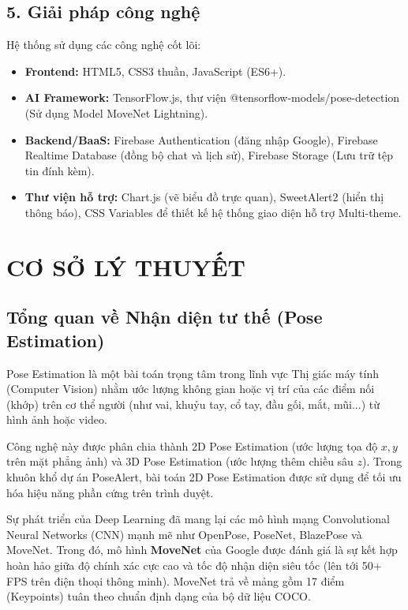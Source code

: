 \documentclass[12pt,a4paper]{report}
\begin{document}
\section*{5. Giải pháp công nghệ}
Hệ thống sử dụng các công nghệ cốt lõi:
\begin{itemize}
    \item \textbf{Frontend:} HTML5, CSS3 thuần, JavaScript (ES6+).
    \item \textbf{AI Framework:} TensorFlow.js, thư viện @tensorflow-models/pose-detection (Sử dụng Model MoveNet Lightning).
    \item \textbf{Backend/BaaS:} Firebase Authentication (đăng nhập Google), Firebase Realtime Database (đồng bộ chat và lịch sử), Firebase Storage (Lưu trữ tệp tin đính kèm).
    \item \textbf{Thư viện hỗ trợ:} Chart.js (vẽ biểu đồ trực quan), SweetAlert2 (hiển thị thông báo), CSS Variables để thiết kế hệ thống giao diện hỗ trợ Multi-theme.
\end{itemize}

\chapter{CƠ SỞ LÝ THUYẾT}

\section{Tổng quan về Nhận diện tư thế (Pose Estimation)}
Pose Estimation là một bài toán trọng tâm trong lĩnh vực Thị giác máy tính (Computer Vision) nhằm ước lượng không gian hoặc vị trí của các điểm nối (khớp) trên cơ thể người (như vai, khuỷu tay, cổ tay, đầu gối, mắt, mũi...) từ hình ảnh hoặc video. 

Công nghệ này được phân chia thành 2D Pose Estimation (ước lượng tọa độ $x, y$ trên mặt phẳng ảnh) và 3D Pose Estimation (ước lượng thêm chiều sâu $z$). Trong khuôn khổ dự án PoseAlert, bài toán 2D Pose Estimation được sử dụng để tối ưu hóa hiệu năng phần cứng trên trình duyệt.

Sự phát triển của Deep Learning đã mang lại các mô hình mạng Convolutional Neural Networks (CNN) mạnh mẽ như OpenPose, PoseNet, BlazePose và MoveNet. Trong đó, mô hình \textbf{MoveNet} của Google được đánh giá là sự kết hợp hoàn hảo giữa độ chính xác cực cao và tốc độ nhận diện siêu tốc (lên tới 50+ FPS trên điện thoại thông minh). MoveNet trả về mảng gồm 17 điểm (Keypoints) tuân theo chuẩn định dạng của bộ dữ liệu COCO.
\end{document}

